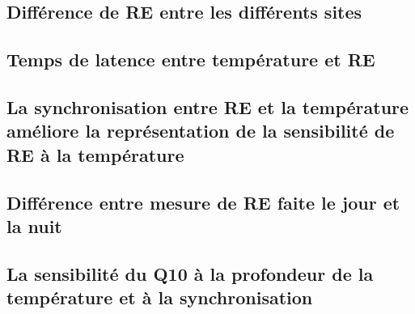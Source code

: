 \subsection{Différence de RE entre les différents sites}

\subsection{Temps de latence entre température et RE}

\subsection{La synchronisation entre RE et la température améliore la représentation de la sensibilité de RE à la température}

\subsection{Différence entre mesure de RE faite le jour et la nuit}

\subsection{La sensibilité du Q10 à la profondeur de la température et à la synchronisation}